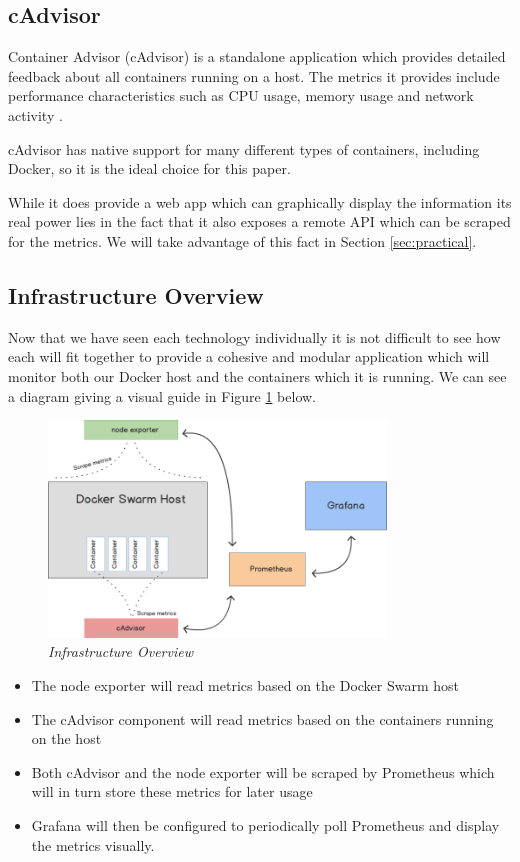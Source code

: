 \subsection{cAdvisor}
\label{subs:cAdvisor}
Container Advisor (cAdvisor) is a standalone application which provides detailed feedback about all containers running on a host. The metrics it provides include performance characteristics such as CPU usage, memory usage and network activity \citep{cAdvisor2017}. 

cAdvisor has native support for many different types of containers, including Docker, so it is the ideal choice for this paper.

While it does provide a web app which can graphically display the information its real power lies in the fact that it also exposes a remote API which can be scraped for the metrics. We will take advantage of this fact in Section \ref{sec:practical}.

\subsection{Infrastructure Overview}
Now that we have seen each technology individually it is not difficult to see how each will fit together to provide a cohesive and modular application which will monitor both our Docker host and the containers which it is running. We can see a diagram giving a visual guide in Figure \ref{fig:infrastructure} below.

\begin{figure}[!h]
\centering
\includegraphics*[width=0.8\textwidth]{components/images/overview}
\caption{\em Infrastructure Overview}
\label{fig:infrastructure}
\end{figure}

\begin{itemize}
	\item The node exporter will read metrics based on the Docker Swarm host
	\item The cAdvisor component will read metrics based on the containers running on the host
	\item Both cAdvisor and the node exporter will be scraped by Prometheus which will in turn store these metrics for later usage
	\item Grafana will then be configured to periodically poll Prometheus and display the metrics visually.
\end{itemize}
